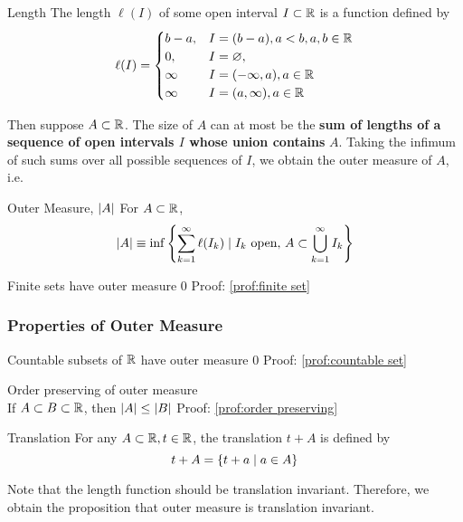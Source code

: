 \begin{df}{Length}
    The length $\ell(I)$ of some open interval $I\subset {\mathbb{R}}$ is a function defined by
    $$\ell(I) =
    \begin{cases}
         b-a, & I = (b-a), a<b, a, b\in {\mathbb{R}}\\
         0,  & I = \varnothing, \\
         \infty & I = (-\infty, a), a\in {\mathbb{R}}\\
         \infty & I = (a, \infty), a\in {\mathbb{R}}
    \end{cases}$$
\end{df}
Then suppose $A\subset {\mathbb{R}}$. The size of $A$ can at most be the \textbf{sum of lengths of a sequence of open intervals $I$ whose union contains} $A$. Taking the infimum of such sums over all possible sequences of $I$, we obtain the outer measure of $A$, i.e.\\

\begin{df}{Outer Measure, $\abs{A}$}
    For $A\subset {\mathbb{R}}$,
    $$\abs{A} \equiv \inf\qty{\sum_{k=1}^\infty \ell(I_k)\mid I_k \text{ open, } A\subset \bigcup_{k=1}^\infty I_k }$$
\end{df}

\begin{prop}{Finite sets have outer measure 0} 
Proof: \ref{prof:finite set}
\end{prop}

\subsubsection{Properties of Outer Measure}
\begin{prop}{Countable subsets of ${\mathbb{R}}$ have outer measure 0} 
Proof: \ref{prof:countable set}
\end{prop}

\begin{prop}{Order preserving of outer measure}\\
If $A\subset B\subset {\mathbb{R}}$, then $\abs{A}\leq\abs{B}$
Proof: \ref{prof:order preserving}
\end{prop}

\begin{df}{Translation}
    For any $A\subset {\mathbb{R}}, t\in {\mathbb{R}}$, the translation $t+A$ is defined by
    \[t+A = \qty{t+a \mid a\in A}\]
\end{df}
Note that the length function should be translation invariant. Therefore, we obtain the proposition that outer measure is translation invariant. \\

